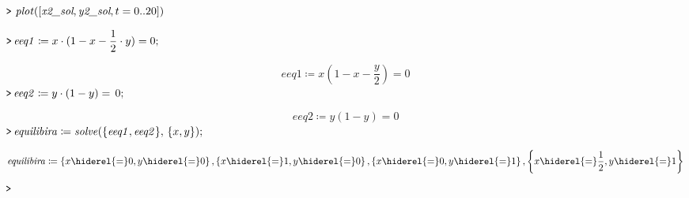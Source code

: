 \documentclass{article}
\begin{document}
{}
\mapleinput
{$ \displaystyle \texttt{>\,} \,\mathit{plot} ([\textit{x2\_sol} ,\textit{y2\_sol} ,t =0..20]) $}

{}
\mapleinput
{$ \displaystyle \texttt{>\,} \mathit{eeq1} \coloneqq x \cdot (1-x -\frac{1}{2}\cdot y)=0; $}

\begin{dmath}\label{(20)}
\mathit{eeq1} \coloneqq x \left(1-x -\frac{y}{2}\right)=0
\end{dmath}
\mapleinput
{$ \displaystyle \texttt{>\,} \mathit{eeq2} \coloneqq y \cdot (1-y)=\,0; $}

\begin{dmath}\label{(21)}
\mathit{eeq2} \coloneqq y \left(1-y \right)=0
\end{dmath}
\mapleinput
{$ \displaystyle \texttt{>\,} \mathit{equilibira} \coloneqq \mathit{solve} (\{\mathit{eeq1} ,\mathit{eeq2} \},\,\{x ,y \}); $}

\begin{dmath}\label{(22)}
\mathit{equilibira} \coloneqq \left\{x  \hiderel{=} 0,y  \hiderel{=} 0\right\},\left\{x  \hiderel{=} 1,y  \hiderel{=} 0\right\},\left\{x  \hiderel{=} 0,y  \hiderel{=} 1\right\},\left\{x  \hiderel{=} \frac{1}{2},y  \hiderel{=} 1\right\}
\end{dmath}
\mapleinput
{$ \displaystyle \texttt{>\,}  $}
\end{document}
